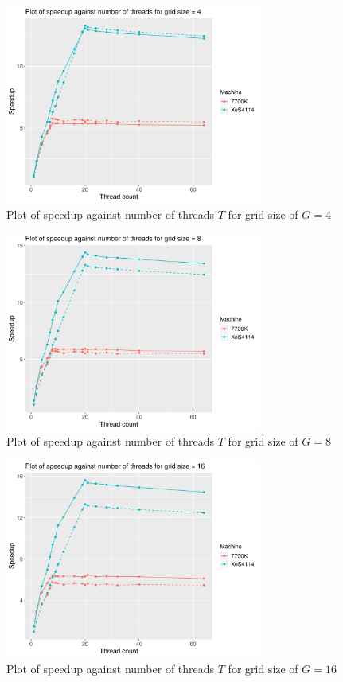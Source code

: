 \documentclass[12pt]{article}
\begin{document}
\begin{figure}[H]
    \centering
    \includegraphics[width=0.75\textwidth]{./extraProcessedResults/optPar-gridSize4-speedup}
    \caption{Plot of speedup against number of threads $T$ for grid size of $G = 4$}
    \label{fig:optPar-gridSize4-speedup}
\end{figure}
\begin{figure}[H]
    \centering
    \includegraphics[width=0.75\textwidth]{./extraProcessedResults/optPar-gridSize8-speedup}
    \caption{Plot of speedup against number of threads $T$ for grid size of $G = 8$}
    \label{fig:optPar-gridSize8-speedup}
\end{figure}
\begin{figure}[H]
    \centering
    \includegraphics[width=0.75\textwidth]{./extraProcessedResults/optPar-gridSize16-speedup}
    \caption{Plot of speedup against number of threads $T$ for grid size of $G = 16$}
    \label{fig:optPar-gridSize16-speedup}
\end{figure}
\end{document}
